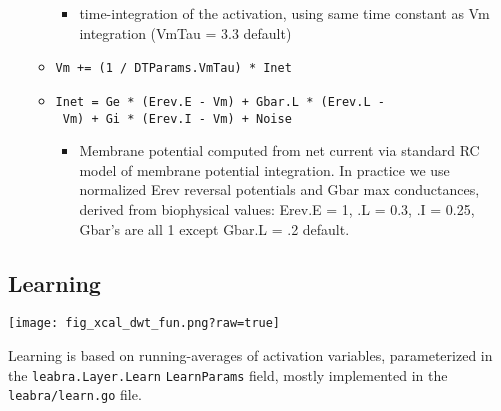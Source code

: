 \begin{itemize}
\begin{itemize}
    \begin{itemize}
    \tightlist
    \item
      time-integration of the activation, using same time constant as Vm
      integration (VmTau = 3.3 default)
    \end{itemize}
  \item
    \texttt{Vm\ +=\ (1\ /\ DTParams.VmTau)\ *\ Inet}
  \item
    \texttt{Inet\ =\ Ge\ *\ (Erev.E\ -\ Vm)\ +\ Gbar.L\ *\ (Erev.L\ -\ Vm)\ +\ Gi\ *\ (Erev.I\ -\ Vm)\ +\ Noise}

    \begin{itemize}
    \tightlist
    \item
      Membrane potential computed from net current via standard RC model
      of membrane potential integration. In practice we use normalized
      Erev reversal potentials and Gbar max conductances, derived from
      biophysical values: Erev.E = 1, .L = 0.3, .I = 0.25, Gbar's are
      all 1 except Gbar.L = .2 default.
    \end{itemize}
  \end{itemize}
\end{itemize}

\hypertarget{learning}{%
\subsection{Learning}\label{learning}}

\texttt{[image: fig\_xcal\_dwt\_fun.png?raw=true]}

Learning is based on running-averages of activation variables,
parameterized in the \texttt{leabra.Layer.Learn} \texttt{LearnParams}
field, mostly implemented in the \texttt{leabra/learn.go} file.

